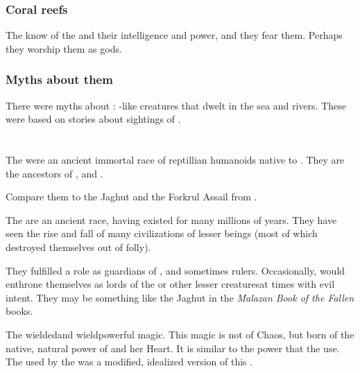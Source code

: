 \subsubsection{Coral reefs}
The \nagae{} know of the  and their intelligence and power, and they fear them. 
Perhaps they worship them as gods. 





\subsubsection{Myths about them}
There were myths about : 
\Scatha-like creatures that dwelt in the sea and rivers. 
These were based on stories about sightings of \nagae. 

















\section{\Ophidians}
\index{\ophidian}
The \ophidians{} were an ancient immortal race of reptillian humanoids native to \Miith. 
They are the ancestors of \dragons, \quiljaaran{} and \nagae. 

Compare them to the Jaghut and the Forkrul Assail from \cite{StevenEriksonIanCameronEsslemont:MalazanBookoftheFallen}.

The \ophidians{} are an ancient race, having existed for many millions of years. 
They have seen the rise and fall of many civilizations of lesser beings (most of which destroyed themselves out of folly). 

They fulfilled a role as guardians of \Miith{}, and sometimes rulers. Occasionally, \ophidians{} would enthrone themselves as lords of the \nephilim{} or other lesser creatures\dash at times with evil intent. They may be something like the Jaghut in the \emph{Malazan Book of the Fallen} books. 

The \ophidians{} wielded\dash and wield\dash powerful magic. 
This magic is not of Chaos, but born of the native, natural power of \Miith{} and her Heart. 
It is similar to the \Wylde{} power that the  use. 
The  used by the  was a modified, idealized version of this \dweomer{}.

